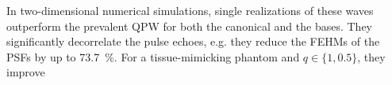 In
two-dimensional numerical simulations,
single realizations of
these waves outperform
the prevalent \acl{QPW} for both
the canonical and
the  bases.
They significantly decorrelate
the pulse echoes, e.g.
they reduce
the \aclp{FEHM} of
the \aclp{PSF} by
up to \SI{73.7}{\percent}.
For
a tissue-mimicking phantom and
$q \in \{ 1, 0.5 \}$,
they improve
